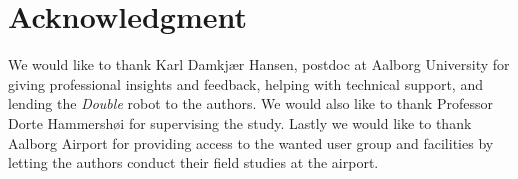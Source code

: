\section*{Acknowledgment}
\label{Acknowledgment}
%
We would like to thank Karl Damkjær Hansen, postdoc at Aalborg University for giving professional insights and feedback, helping with technical support, and lending the \textit{Double} robot to the authors.
We would also like to thank Professor Dorte Hammershøi for supervising the study. 
Lastly we would like to thank Aalborg Airport for providing access to the wanted user group and facilities by letting the authors conduct their field studies at the airport. 